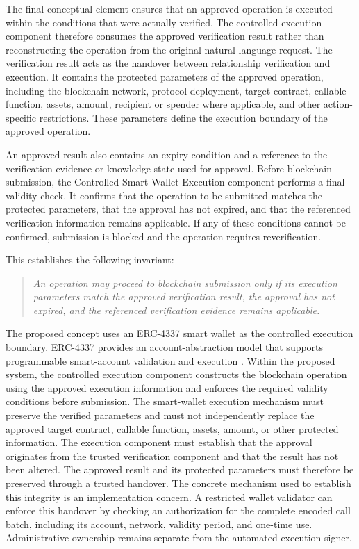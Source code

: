 The final conceptual element ensures that an approved operation is executed
within the conditions that were actually verified. The controlled execution
component therefore consumes the approved verification result rather than
reconstructing the operation from the original natural-language request. The verification result acts as the handover between relationship verification
and execution. It contains the protected parameters of the approved operation,
including the blockchain network, protocol deployment, target contract,
callable function, assets, amount, recipient or spender where applicable,
and other action-specific restrictions. These parameters define the
execution boundary of the approved operation.

An approved result also contains an expiry condition and a reference to the
verification evidence or knowledge state used for approval. Before blockchain
submission, the Controlled Smart-Wallet Execution component performs a final
validity check. It confirms that the operation to be submitted matches the
protected parameters, that the approval has not expired, and that the referenced
verification information remains applicable. If any of these conditions cannot
be confirmed, submission is blocked and the operation requires reverification.

This establishes the following invariant:

\begin{quote}
\textit{An operation may proceed to blockchain submission only if its
execution parameters match the approved verification result, the approval
has not expired, and the referenced verification evidence remains applicable.}
\end{quote}

The proposed concept uses an ERC-4337 smart wallet as the controlled execution
boundary. ERC-4337 provides an account-abstraction model that supports
programmable smart-account validation and execution \cite{erc4337}. Within
the proposed system, the controlled execution component constructs the
blockchain operation using the approved execution information and enforces
the required validity conditions before submission. The smart-wallet
execution mechanism must preserve the verified parameters and must not
independently replace the approved target contract, callable function,
assets, amount, or other protected information. The execution component must establish that the approval originates from
the trusted verification component and that the result has not been
altered. The approved result and its protected parameters must therefore
be preserved through a trusted handover. The concrete mechanism used
to establish this integrity is an implementation concern. A restricted
wallet validator can enforce this handover by checking an authorization
for the complete encoded call batch, including its account, network,
validity period, and one-time use. Administrative ownership remains
separate from the automated execution signer.

